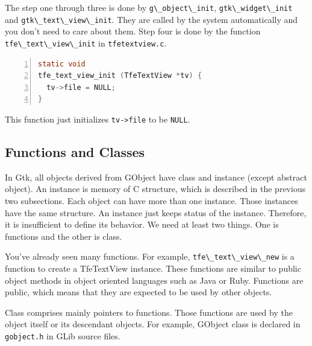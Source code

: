 The step one through three is done by
\passthrough{\lstinline!g\_object\_init!},
\passthrough{\lstinline!gtk\_widget\_init!} and
\passthrough{\lstinline!gtk\_text\_view\_init!}. They are called by the
system automatically and you don't need to care about them. Step four is
done by the function \passthrough{\lstinline!tfe\_text\_view\_init!} in
\passthrough{\lstinline!tfetextview.c!}.

\begin{lstlisting}[language=C, numbers=left]
static void
tfe_text_view_init (TfeTextView *tv) {
  tv->file = NULL;
}
\end{lstlisting}

This function just initializes \passthrough{\lstinline!tv->file!} to be
\passthrough{\lstinline!NULL!}.

\hypertarget{functions-and-classes}{%
\subsection{Functions and Classes}\label{functions-and-classes}}

In Gtk, all objects derived from GObject have class and instance (except
abstract object). An instance is memory of C structure, which is
described in the previous two subsections. Each object can have more
than one instance. Those instances have the same structure. An instance
just keeps status of the instance. Therefore, it is insufficient to
define its behavior. We need at least two things. One is functions and
the other is class.

You've already seen many functions. For example,
\passthrough{\lstinline!tfe\_text\_view\_new!} is a function to create a
TfeTextView instance. These functions are similar to public object
methods in object oriented languages such as Java or Ruby. Functions are
public, which means that they are expected to be used by other objects.

Class comprises mainly pointers to functions. Those functions are used
by the object itself or its descendant objects. For example, GObject
class is declared in \passthrough{\lstinline!gobject.h!} in GLib source
files.

